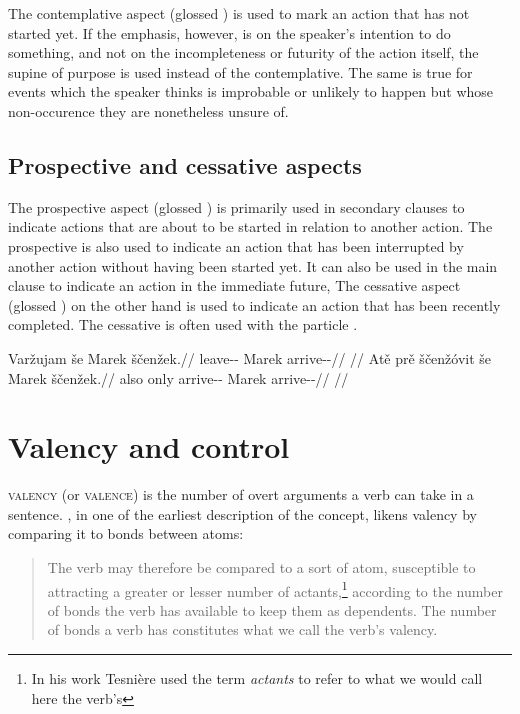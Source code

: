 The contemplative aspect (glossed \Ctp{}) is used to mark an action that has not
started yet. If the emphasis, however, is on the speaker's intention to do
something, and not on the incompleteness or futurity of the action itself, the
supine of purpose is used instead of the contemplative. The same is true for
events which the speaker thinks is improbable or unlikely to happen but whose
non-occurence they are nonetheless unsure of.

\subsection{Prospective and cessative aspects}

The prospective aspect (glossed \Prosp{}) is primarily used in secondary clauses
to indicate actions that are about to be started in relation to another action.
The prospective is also used to indicate an action that has been interrupted by
another action without having been started yet. It can also be used in the main
clause to indicate an action in the immediate future, The cessative aspect
(glossed \Ces{}) on the other hand is used to indicate an action that has been
recently completed. The cessative is often used with the particle
.

\pex
\a\begingl
\gla Varžujam še Marek ščenžek.//
\glb leave-\Av{}-\Prosp{} \Com{} Marek arrive-\Av{}-\Pf{}//
\glft {} //
\endgl
\a\begingl
\gla Atě prě ščenžóvit še Marek ščenžek.//
\glb also only arrive-\Av{}-\Ces{} \Com{} Marek arrive-\Av{}-\Pf{}//
\glft {} //
\endgl
\xe

\section{Valency and control}

{\scshape valency} (or {\scshape valence}) is the number of overt
arguments a verb can take in a sentence.
\textcite[239]{tesniere1965}, in one of the earliest description of the concept,
likens valency by comparing it to bonds between atoms:
\begin{quotation}
	\small
The verb may therefore be compared to a sort of atom, susceptible to attracting
a greater or lesser number of actants,\footnote{In his work Tesnière used the
term \emph{actants} to refer to what we would call here the verb's
} according to the number of bonds the verb has available to
keep them as dependents. The number of bonds a verb has constitutes what we call
the verb's valency.
\end{quotation}


